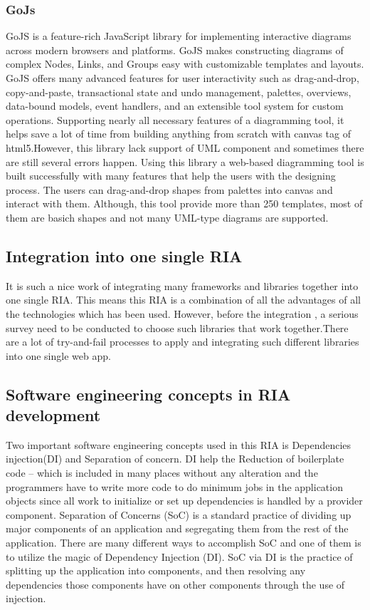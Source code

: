\documentclass[14pt,a4paper]{extreport}
\begin{document}
 			\subsubsection{GoJs}
 				GoJS is a feature-rich JavaScript library for implementing interactive diagrams across modern browsers and platforms. GoJS makes constructing diagrams of complex Nodes, Links, and Groups easy with customizable templates and layouts. GoJS offers many advanced features for user interactivity such as drag-and-drop, copy-and-paste, transactional state and undo management, palettes, overviews, data-bound models, event handlers, and an extensible tool system for custom operations. Supporting nearly all necessary features of a diagramming tool, it helps save a lot of time from building anything from scratch with canvas tag of html5.However, this library lack support of UML component and sometimes there are still several errors happen.
 				Using this library a web-based diagramming tool is built successfully with many features that help the users with the designing process. The users can drag-and-drop shapes from palettes into canvas and interact with them. Although, this tool provide more than 250 templates, most of them are basich shapes and not many UML-type diagrams are supported.
		
		\subsection{Integration into one single RIA}
			It is such a nice work of integrating many frameworks and libraries together into one single RIA. This means this RIA is a combination of all the advantages of all the technologies which has been used. However, before the integration , a serious survey need to be conducted to choose such libraries that work together.There are a lot of try-and-fail processes to apply and integrating such different libraries into one single web app. 
		
		\subsection{Software engineering concepts in RIA development}
			Two important software engineering concepts used in this RIA is Dependencies injection(DI) and Separation of concern. DI help the Reduction of boilerplate code – which is included in many places without any alteration and the programmers have to write more code to do minimum jobs in the application objects since all work to initialize or set up dependencies is handled by a provider component. Separation of Concerns (SoC) is a standard practice of dividing up major components of an application and segregating them from the rest of the application. There are many different ways to accomplish SoC and one of them is to utilize the magic of Dependency Injection (DI). SoC via DI is the practice of splitting up the application into components, and then resolving any dependencies those components have on other components through the use of injection.
			
\end{document}
